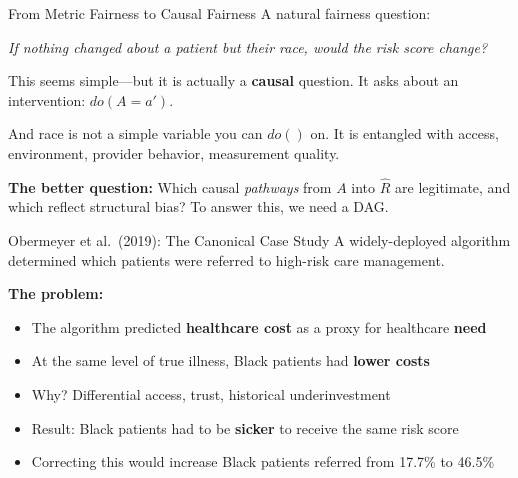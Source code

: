 \documentclass[aspectratio=169,10pt]{beamer}
\begin{document}
\begin{frame}{From Metric Fairness to Causal Fairness}
A natural fairness question:

\vspace{0.3em}
\begin{block}{}
\emph{If nothing changed about a patient but their race, would the risk score change?}
\end{block}

\vspace{0.3em}
\pause
This seems simple---but it is actually a \textbf{causal} question. It asks about an intervention: $do(A = a')$.

\vspace{0.3em}
And race is not a simple variable you can $do()$ on. It is entangled with access, environment, provider behavior, measurement quality.

\vspace{0.3em}
\pause
\textbf{The better question:} Which causal \emph{pathways} from $A$ into $\hat{R}$ are legitimate, and which reflect structural bias? To answer this, we need a DAG.
\end{frame}

\begin{frame}{Obermeyer et al.\ (2019): The Canonical Case Study}
A widely-deployed algorithm determined which patients were referred to high-risk care management.

\vspace{0.3em}
\textbf{The problem:}
\begin{itemize}[<+->]
    \item The algorithm predicted \textbf{healthcare cost} as a proxy for healthcare \textbf{need}
    \item At the same level of true illness, Black patients had \textbf{lower costs}
    \item Why? Differential access, trust, historical underinvestment
    \item Result: Black patients had to be \textbf{sicker} to receive the same risk score
    \item Correcting this would increase Black patients referred from 17.7\% to 46.5\%
\end{itemize}
\end{frame}
\end{document}
